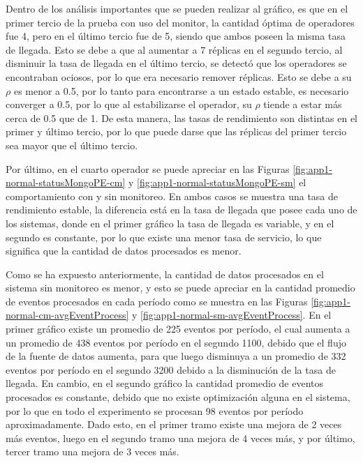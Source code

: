 Dentro de los análisis importantes que se pueden realizar al gráfico, es que en el primer tercio de la prueba con uso del monitor, la cantidad óptima de operadores fue 4, pero en el último tercio fue de 5, siendo que ambos poseen la misma tasa de llegada. Esto se debe a que al aumentar a 7 réplicas en el segundo tercio, al disminuir la tasa de llegada en el último tercio, se detectó que los operadores se encontraban ociosos, por lo que era necesario remover réplicas. Esto se debe a su $\rho$ es menor a 0.5, por lo tanto para encontrarse a un estado estable, es necesario converger a 0.5, por lo que al estabilizarse el operador, su $\rho$ tiende a estar más cerca de 0.5 que de 1. De esta manera, las tasas de rendimiento son distintas en el primer y último tercio, por lo que puede darse que las réplicas del primer tercio sea mayor que el último tercio.

Por último, en el cuarto operador se puede apreciar en las Figuras \ref{fig:app1-normal-statusMongoPE-cm} y \ref{fig:app1-normal-statusMongoPE-sm} el comportamiento con y sin monitoreo. En ambos casos se muestra una tasa de rendimiento estable, la diferencia está en la tasa de llegada que posee cada uno de los sistemas, donde en el primer gráfico la tasa de llegada es variable, y en el segundo es constante, por lo que existe una menor tasa de servicio, lo que significa que la cantidad de datos procesados es menor.

Como se ha expuesto anteriormente, la cantidad de datos procesados en el sistema sin monitoreo es menor, y esto se puede apreciar en la cantidad promedio de eventos procesados en cada período como se muestra en las Figuras \ref{fig:app1-normal-cm-avgEventProcess} y \ref{fig:app1-normal-sm-avgEventProcess}. En el primer gráfico existe un promedio de 225 eventos por período, el cual aumenta a un promedio de 438 eventos por período en el segundo 1100, debido que el flujo de la fuente de datos aumenta, para que luego disminuya a un promedio de 332 eventos por período en el segundo 3200 debido a la disminución de la tasa de llegada. En cambio, en el segundo gráfico la cantidad promedio de eventos procesados es constante, debido que no existe optimización alguna en el sistema, por lo que en todo el experimento se procesan 98 eventos por período aproximadamente. Dado esto, en el primer tramo existe una mejora de 2 veces más eventos, luego en el segundo tramo una mejora de 4 veces más, y por último, tercer tramo una mejora de 3 veces más.

